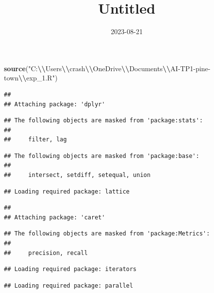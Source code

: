\documentclass[
]{article}
\title{Untitled}
\author{}
\date{\vspace{-2.5em}2023-08-21}
\newenvironment{Shaded}{\begin{snugshade}}{\end{snugshade}}
\newcommand{\FunctionTok}[1]{\textcolor[rgb]{0.13,0.29,0.53}{\textbf{#1}}}
\newcommand{\NormalTok}[1]{#1}
\newcommand{\SpecialCharTok}[1]{\textcolor[rgb]{0.81,0.36,0.00}{\textbf{#1}}}
\newcommand{\StringTok}[1]{\textcolor[rgb]{0.31,0.60,0.02}{#1}}
\begin{document}
\maketitle

\begin{Shaded}
\begin{Highlighting}[]
\FunctionTok{source}\NormalTok{(}\StringTok{"C:}\SpecialCharTok{\textbackslash{}\textbackslash{}}\StringTok{Users}\SpecialCharTok{\textbackslash{}\textbackslash{}}\StringTok{crash}\SpecialCharTok{\textbackslash{}\textbackslash{}}\StringTok{OneDrive}\SpecialCharTok{\textbackslash{}\textbackslash{}}\StringTok{Documents}\SpecialCharTok{\textbackslash{}\textbackslash{}}\StringTok{AI{-}TP1{-}pine{-}town}\SpecialCharTok{\textbackslash{}\textbackslash{}}\StringTok{exp\_1.R"}\NormalTok{)}
\end{Highlighting}
\end{Shaded}

\begin{verbatim}
## 
## Attaching package: 'dplyr'
\end{verbatim}

\begin{verbatim}
## The following objects are masked from 'package:stats':
## 
##     filter, lag
\end{verbatim}

\begin{verbatim}
## The following objects are masked from 'package:base':
## 
##     intersect, setdiff, setequal, union
\end{verbatim}

\begin{verbatim}
## Loading required package: lattice
\end{verbatim}

\begin{verbatim}
## 
## Attaching package: 'caret'
\end{verbatim}

\begin{verbatim}
## The following objects are masked from 'package:Metrics':
## 
##     precision, recall
\end{verbatim}

\begin{verbatim}
## Loading required package: iterators
\end{verbatim}

\begin{verbatim}
## Loading required package: parallel
\end{verbatim}
\end{document}

